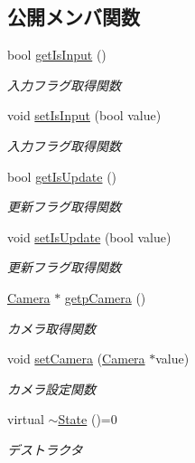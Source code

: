 \subsection*{公開メンバ関数}
\begin{DoxyCompactItemize}
\item 
bool \mbox{\hyperlink{class_camera_1_1_state_a23d6de73794a7a47a640ccb4d3e1b4ca}{get\+Is\+Input}} ()
\begin{DoxyCompactList}\small\item\em 入力フラグ取得関数 \end{DoxyCompactList}\item 
void \mbox{\hyperlink{class_camera_1_1_state_a29e30e611ec0fd1282e552a4304588bc}{set\+Is\+Input}} (bool value)
\begin{DoxyCompactList}\small\item\em 入力フラグ取得関数 \end{DoxyCompactList}\item 
bool \mbox{\hyperlink{class_camera_1_1_state_a03b8930b430e095cce5f63853f845494}{get\+Is\+Update}} ()
\begin{DoxyCompactList}\small\item\em 更新フラグ取得関数 \end{DoxyCompactList}\item 
void \mbox{\hyperlink{class_camera_1_1_state_a1061b2370753de100ffd84ca877203d2}{set\+Is\+Update}} (bool value)
\begin{DoxyCompactList}\small\item\em 更新フラグ取得関数 \end{DoxyCompactList}\item 
\mbox{\hyperlink{class_camera}{Camera}} $\ast$ \mbox{\hyperlink{class_camera_1_1_state_a427018e0f1139ec2c189a8369eace5c3}{getp\+Camera}} ()
\begin{DoxyCompactList}\small\item\em カメラ取得関数 \end{DoxyCompactList}\item 
void \mbox{\hyperlink{class_camera_1_1_state_a3c95f7df7651ddca8596686a118eb725}{set\+Camera}} (\mbox{\hyperlink{class_camera}{Camera}} $\ast$value)
\begin{DoxyCompactList}\small\item\em カメラ設定関数 \end{DoxyCompactList}\item 
virtual \mbox{\hyperlink{class_camera_1_1_state_a7d179b912e68fa3dc659ae4d5422ca97}{$\sim$\+State}} ()=0
\begin{DoxyCompactList}\small\item\em デストラクタ \end{DoxyCompactList}\item 

\end{DoxyCompactItemize}
